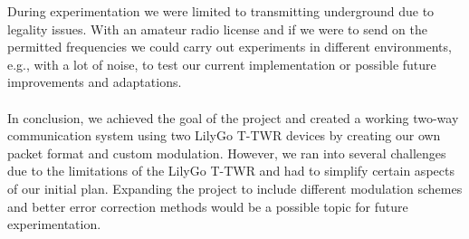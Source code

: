 During experimentation we were limited to transmitting underground due to legality issues. With an amateur radio license and if we were to send on the permitted frequencies we could carry out experiments in different environments, e.g., with a lot of noise, to test our current implementation or possible future improvements and adaptations.
\\ \\ 
In conclusion, we achieved the goal of the project and created a working two-way communication system using two LilyGo T-TWR devices by creating our own packet format and custom modulation. However, we ran into several challenges due to the limitations of the LilyGo T-TWR and had to simplify certain aspects of our initial plan. Expanding the project to include different modulation schemes and better error correction methods would be a possible topic for future experimentation.



